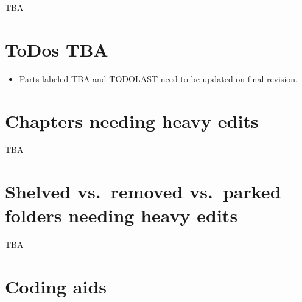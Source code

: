 \documentclass[
]{book}
\providecommand{\tightlist}{%
  \setlength{\itemsep}{0pt}\setlength{\parskip}{0pt}}
\begin{document}
TBA

\hypertarget{todos-tba}{%
\section*{ToDos TBA}\label{todos-tba}}

\begin{itemize}
\tightlist
\item
  Parts labeled TBA and TODOLAST need to be updated on final revision.
\end{itemize}

\hypertarget{chapters-needing-heavy-edits}{%
\section*{Chapters needing heavy edits}\label{chapters-needing-heavy-edits}}

TBA

\hypertarget{shelved-vs.-removed-vs.-parked-folders-needing-heavy-edits}{%
\section*{Shelved vs.~removed vs.~parked folders needing heavy edits}\label{shelved-vs.-removed-vs.-parked-folders-needing-heavy-edits}}

TBA

\hypertarget{coding-aids}{%
\section*{Coding aids}\label{coding-aids}}
\end{document}
